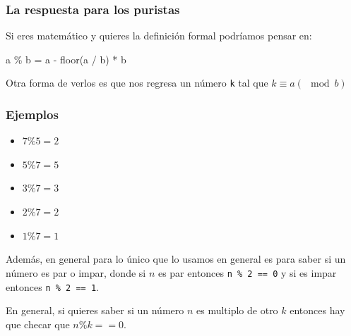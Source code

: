 \documentclass[12pt, fleqn]{report}                             %
\def \Eq {equation}                                             %
\newenvironment{MultiLineEquation*}[1]                          %
        {\begin{\Eq*}\begin{alignedat}{#1}}                         %
        {\end{alignedat}\end{\Eq*}}                                 %
\theoremstyle{break}                                            %
\begin{document}
                \subsubsection{La respuesta para los puristas}

                    Si eres matemático y quieres la definición formal podríamos pensar en:

                    \begin{MultiLineEquation*}{3}
                        a \% b = a - floor(a / b) * b
                    \end{MultiLineEquation*}

                    Otra forma de verlos es que nos regresa un número \texttt{k}
                    tal que $k \equiv a (\mod b)$

                \subsubsection{Ejemplos}
                
                    \begin{itemize}
                        \item $7 \% 5 = 2$
                        \item $5 \% 7 = 5$
                        \item $3 \% 7 = 3$
                        \item $2 \% 7 = 2$
                        \item $1 \% 7 = 1$
                    \end{itemize}

                    Además, en general para lo único que lo usamos en general
                    es para saber si un número es par o impar, donde
                    si $n$ es par entonces \texttt{n \% 2 == 0} y si es impar
                    entonces \texttt{n \% 2 == 1}.

                    En general, si quieres saber si un número $n$ es multiplo de 
                    otro $k$ entonces hay que checar que $n \% k == 0$.


        \clearpage
\end{document}
